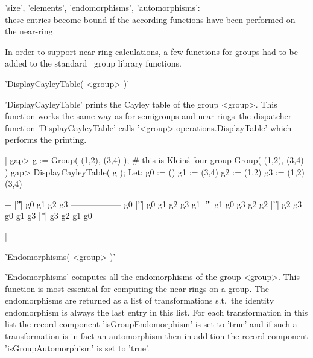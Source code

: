 'size', 'elements', 'endomorphisms', 
      'automorphisms': \\ 
  these entries become bound if the according functions have been performed
  on the near-ring.


   
In order to support near-ring calculations, a few functions for groups had to 
be added to the standard \GAP\ group library functions. 

   
'DisplayCayleyTable( <group> )'  

'DisplayCayleyTable' prints the Cayley table of the group <group>. This 
function works the same way as for semigroups and near-rings\:\ the 
dispatcher function 'DisplayCayleyTable' calls
'<group>.op\-er\-a\-tions.Display\-Ta\-ble' which performs the printing.

|  gap> g := Group( (1,2), (3,4) );       # this is Klein\'s four group  
  Group( (1,2), (3,4) )
  gap> DisplayCayleyTable( g );
  Let:
  g0 := ()
  g1 := (3,4)
  g2 := (1,2)
  g3 := (1,2)(3,4)

    +  |'\|'| g0 g1 g2 g3 
   ------------------
    g0 |'\|'| g0 g1 g2 g3 
    g1 |'\|'| g1 g0 g3 g2 
    g2 |'\|'| g2 g3 g0 g1 
    g3 |'\|'| g3 g2 g1 g0 

|

   
'Endomorphisms( <group> )'  

'Endomorphisms' computes all the endomorphisms of the group <group>. 
This function is most essential for computing the near-rings on a group.
The endomorphisms are returned as a list of transformations s.t.\ 
the identity endomorphism is always the last entry in this list. For each  
transformation in this list the record component 
'is\-Group\-En\-do\-mor\-phism' is
set to 'true' and if such a transformation is in fact an automorphism 
then in
addition the record component 
'is\-Group\-Auto\-mor\-phism' is set to 'true'.

